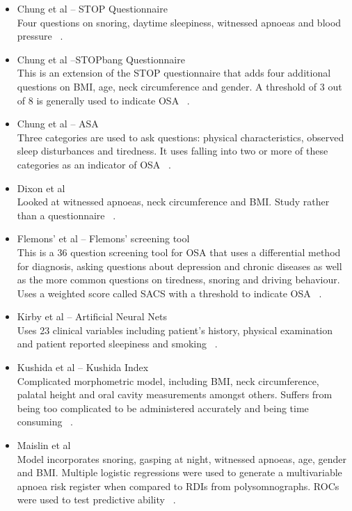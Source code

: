 \begin{itemize}
\item Chung et al – STOP Questionnaire \\
Four questions on snoring, daytime sleepiness, witnessed apnoeas and blood pressure ~\cite{chung2008stop}.
\item Chung et al –STOPbang Questionnaire \\
This is an extension of the STOP questionnaire that adds four additional questions on BMI, age, neck circumference and gender. A threshold of 3 out of 8 is generally used to indicate OSA ~\cite{chung2012high}.
\item Chung et al – ASA \\
Three categories are used to ask questions: physical characteristics, observed sleep disturbances and tiredness. It uses falling into two or more of these categories as an indicator of OSA ~\cite{chung2008validation}.
\item Dixon et al \\
Looked at witnessed apnoeas, neck circumference and BMI. Study rather than a questionnaire ~\cite{dixon2003predicting}.
\item Flemons’ et al – Flemons’ screening tool \\
This is a 36 question screening tool for OSA that uses a differential method for diagnosis, asking questions about depression and chronic diseases as well as the more common questions on tiredness, snoring and driving behaviour. Uses a weighted score called SACS with a threshold to indicate OSA ~\cite{flemons1994likelihood}.
\item Kirby et al – Artificial Neural Nets \\
Uses 23 clinical variables including patient’s history, physical examination and patient reported sleepiness and smoking ~\cite{kirby1999neural}.
\item Kushida et al – Kushida Index \\
Complicated morphometric model, including BMI, neck circumference, palatal height and oral cavity measurements amongst others. Suffers from being too complicated to be administered accurately and being time consuming ~\cite{kushida1997predictive}.
\item Maislin et al \\
Model incorporates snoring, gasping at night, witnessed apnoeas, age, gender and BMI. Multiple logistic regressions were used to generate a multivariable apnoea risk register when compared to RDIs from polysomnographs. ROCs were used to test predictive ability ~\cite{dinges1995survey}.

\end{itemize}
